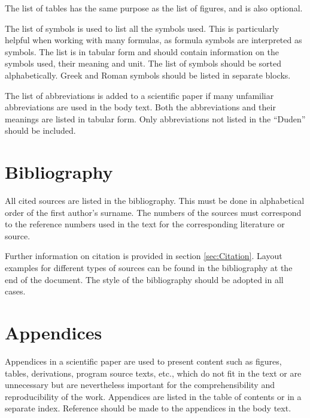 The list of tables has the same purpose as the list of figures, and is also optional.

The list of symbols is used to list all the symbols used. This is particularly helpful when working with many formulas, as formula symbols are interpreted as symbols. The list is in tabular form and should contain information on the symbols used, their meaning and unit. The list of symbols should be sorted alphabetically. Greek and Roman symbols should be listed in separate blocks.

The list of abbreviations is added to a scientific paper if many unfamiliar abbreviations are used in the body text. Both the abbreviations and their meanings are listed in tabular form. Only abbreviations not listed in the "`Duden"' should be included. 

\section{Bibliography}
\label{sec:Literature}

All cited sources are listed in the bibliography. This must be done in alphabetical order of the first author's surname. The numbers of the sources must correspond to the reference numbers used in the text for the corresponding literature or source.

Further information on citation is provided in section \ref{sec:Citation}. Layout examples for different types of sources can be found in the bibliography at the end of the document. The style of the bibliography should be adopted in all cases.

\section{Appendices}
\label{sec:Appendices}

Appendices in a scientific paper are used to present content such as figures, tables, derivations, program source texts, etc., which do not fit in the text or are unnecessary but are nevertheless important for the comprehensibility and reproducibility of the work. Appendices are listed in the table of contents or in a separate index. Reference should be made to the appendices in the body text.

